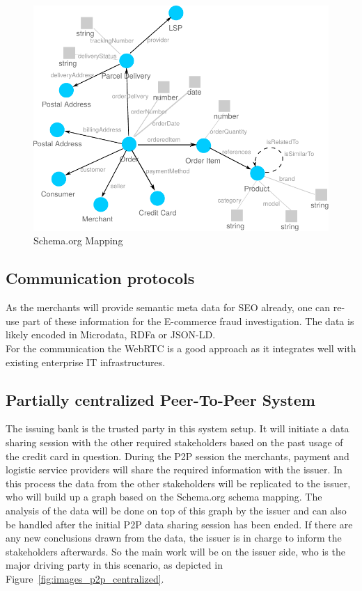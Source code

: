 \begin{figure}[H]
	\centering
		\includegraphics[width=0.8\columnwidth]{images/schema_org_mapping.pdf}
	\caption{Schema.org Mapping}
\label{fig:images_schema_org}
\end{figure}


\subsection{Communication protocols}
\label{subsec:comm_protocol}

As the merchants will provide semantic meta data for \gls{SEO} already, one can re-use part of these information for the E-commerce fraud investigation. The data is likely encoded in Microdata, \gls{RDFa} or \gls{JSON-LD}. \\

For the communication the \gls{WebRTC} is a good approach as it integrates well with existing enterprise IT infrastructures.


\subsection{Partially centralized Peer-To-Peer System}
\label{subsec:p2p_partially_centralized_system}

The issuing bank is the trusted party in this system setup. It will initiate a data sharing session with the other required stakeholders based on the past usage of the credit card in question. During the P2P session the merchants, payment and logistic service providers will share the required information with the issuer. In this process the data from the other stakeholders will be replicated to the issuer, who will build up a graph based on the Schema.org schema mapping. The analysis of the data will be done on top of this graph by the issuer and can also be handled after the initial P2P data sharing session has been ended. If there are any new conclusions drawn from the data, the issuer is in charge to inform the stakeholders afterwards. So the main work will be on the issuer side, who is the major driving party in this scenario, as depicted in Figure~\ref{fig:images_p2p_centralized}.\@

